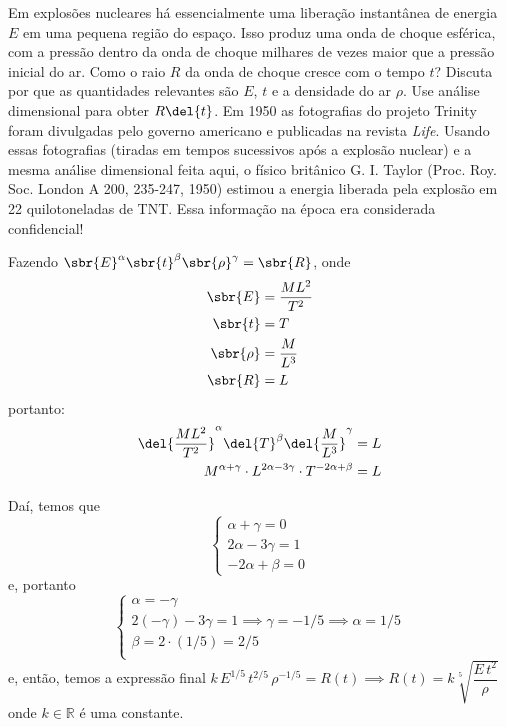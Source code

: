\documentclass[]{IMTexam}
\begin{document}
\begin{questions}
	Em explosões nucleares há essencialmente uma liberação instantânea de energia $ E $ em uma pequena região do espaço.
	Isso produz uma onda de choque esférica, com a pressão dentro da onda de choque milhares de vezes maior que a pressão inicial do ar.
	Como o raio $ R $ da onda de choque cresce com o tempo $ t $?
	Discuta por que as quantidades relevantes são $ E $, $ t $ e a densidade do ar $ \rho $.
	Use análise dimensional para obter $ R\del{t} $.
	Em 1950 as fotografias do projeto Trinity foram divulgadas pelo governo americano e publicadas na revista \textit{Life}.
	Usando essas fotografias (tiradas em tempos sucessivos após a explosão nuclear) e a mesma análise dimensional feita aqui, o físico britânico G. I. Taylor (Proc. Roy. Soc. London A 200, 235-247, 1950) estimou a energia liberada pela explosão em 22 quilotoneladas de TNT.
	Essa informação na época era considerada confidencial!

	\begin{solution}

		\correctspacing
		\begin{multi}
			Fazendo $ \sbr{E}^{\alpha} \sbr{t}^{\beta} \sbr{\rho}^{\gamma}=\sbr{R} $, onde
			\begin{align*}
				\sbr{E}    & =\dfrac{ML^{2}}{T^{2}} \\
				\sbr{t}    & =T                     \\
				\sbr{\rho} & =\dfrac{M}{L^{3}}      \\
				\sbr{R}    & =L
			\end{align*}
			portanto: \begin{align*}
				\del{\dfrac{ML^{2}}{T^{2}}}^{\alpha}\del{T}^{\beta}\del{\dfrac{M}{L^{3}}}^{\gamma} & =L \\
				M^{\alpha+\gamma}\cdot L^{2\alpha-3\gamma}\cdot T^{-2\alpha+\beta}                 & =L
			\end{align*}

			\nextcol

			Daí, temos que
			\[ \begin{cases}
					\alpha+\gamma=0   \\
					2\alpha-3\gamma=1 \\
					-2\alpha+\beta=0
				\end{cases} \]
			e, portanto
			\[ \begin{cases}
					\alpha=-\gamma                                            \\
					2(-\gamma)-3\gamma=1\implies\gamma=-1/5\implies\alpha=1/5 \\
					\beta=2\cdot(1/5)=2/5                                     \\
				\end{cases} \]
			e, então, temos a expressão final $ k\,E^{1/5}\, t^{2/5}\, \rho^{-1/5}=R(t)\implies R(t)=k\sqrt[5]{\dfrac{E\,t^{2}}{\rho}} $ onde $ k\in\mathbb{R} $ é uma constante.
		\end{multi}


\end{solution}
\end{questions}
\end{document}
